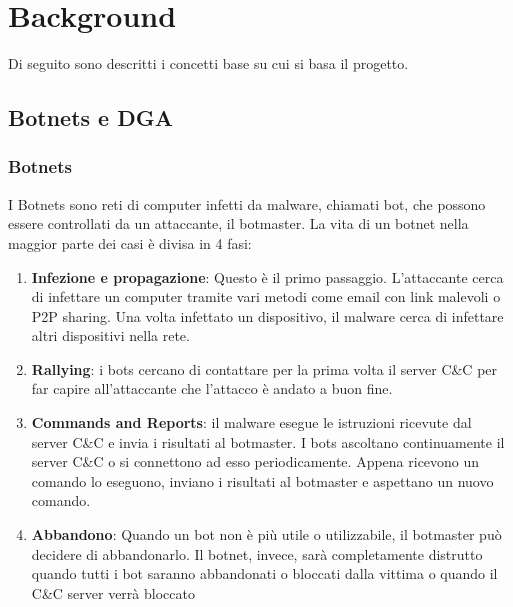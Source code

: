 \documentclass[12pt,a4paper,openright,twoside]{book}
\begin{document}

\chapter{Background}

Di seguito sono descritti i concetti base su cui si basa il progetto.

\section{Botnets e DGA}

\subsection{Botnets}

I Botnets sono reti di computer infetti da malware, chiamati bot,
che possono essere controllati da un attaccante, il botmaster.
La vita di un botnet nella maggior parte dei casi è divisa in 4 fasi:
\begin{enumerate}
    \item \textbf{Infezione e propagazione}: Questo è il primo
    passaggio. L'attaccante cerca di infettare un computer
    tramite vari metodi come email con link malevoli o \acrfull{P2P} sharing.
    Una volta infettato un dispositivo, il malware cerca di infettare
    altri dispositivi nella rete.

    \item \textbf{Rallying}: i bots cercano di contattare per la prima volta
    il server \acrshort{C&C} per far capire all'attaccante
    che l'attacco è andato a buon fine.

    \item \textbf{Commands and Reports}: il malware esegue le istruzioni
    ricevute dal server \acrshort{C&C} e invia i risultati al botmaster.
    I bots ascoltano continuamente il server \acrshort{C&C} 
    o si connettono ad esso periodicamente. Appena ricevono
    un comando lo eseguono, inviano i risultati al botmaster
    e aspettano un nuovo comando.

    \item \textbf{Abbandono}: Quando un bot non è più utile o utilizzabile,
    il botmaster può decidere di abbandonarlo. Il botnet, invece,
    sarà completamente distrutto quando tutti i bot saranno
    abbandonati o bloccati dalla vittima o quando il \acrshort{C&C} server
    verrà bloccato


\end{enumerate}
\end{document}
